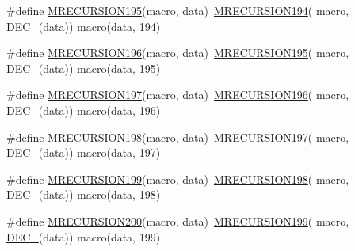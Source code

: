 \begin{DoxyCompactItemize}
\item 
\#define \mbox{\hyperlink{group__group__sam0__utils__mrecursion_ga4f360a4ac5882dfa8c9c2ce94e1bf496}{M\+R\+E\+C\+U\+R\+S\+I\+O\+N195}}(macro,  data)~\mbox{\hyperlink{group__group__sam0__utils__mrecursion_ga68e422a9d4d85b27a7c8b4fb415266d4}{M\+R\+E\+C\+U\+R\+S\+I\+O\+N194}}(  macro, \mbox{\hyperlink{group__group__sam0__utils__mrecursion_ga1d23d683797679dca8c3512a54a5dcae}{D\+E\+C\+\_\+}}(data))   macro(data, 194)
\item 
\#define \mbox{\hyperlink{group__group__sam0__utils__mrecursion_gad4a12ea05cb3470468f67b26d9459f8f}{M\+R\+E\+C\+U\+R\+S\+I\+O\+N196}}(macro,  data)~\mbox{\hyperlink{group__group__sam0__utils__mrecursion_ga4f360a4ac5882dfa8c9c2ce94e1bf496}{M\+R\+E\+C\+U\+R\+S\+I\+O\+N195}}(  macro, \mbox{\hyperlink{group__group__sam0__utils__mrecursion_ga1d23d683797679dca8c3512a54a5dcae}{D\+E\+C\+\_\+}}(data))   macro(data, 195)
\item 
\#define \mbox{\hyperlink{group__group__sam0__utils__mrecursion_gae419c59f8b191d6b6dd3c3c3e94448b6}{M\+R\+E\+C\+U\+R\+S\+I\+O\+N197}}(macro,  data)~\mbox{\hyperlink{group__group__sam0__utils__mrecursion_gad4a12ea05cb3470468f67b26d9459f8f}{M\+R\+E\+C\+U\+R\+S\+I\+O\+N196}}(  macro, \mbox{\hyperlink{group__group__sam0__utils__mrecursion_ga1d23d683797679dca8c3512a54a5dcae}{D\+E\+C\+\_\+}}(data))   macro(data, 196)
\item 
\#define \mbox{\hyperlink{group__group__sam0__utils__mrecursion_gae809796894cf07b1f6d2c9e04b473764}{M\+R\+E\+C\+U\+R\+S\+I\+O\+N198}}(macro,  data)~\mbox{\hyperlink{group__group__sam0__utils__mrecursion_gae419c59f8b191d6b6dd3c3c3e94448b6}{M\+R\+E\+C\+U\+R\+S\+I\+O\+N197}}(  macro, \mbox{\hyperlink{group__group__sam0__utils__mrecursion_ga1d23d683797679dca8c3512a54a5dcae}{D\+E\+C\+\_\+}}(data))   macro(data, 197)
\item 
\#define \mbox{\hyperlink{group__group__sam0__utils__mrecursion_gae1ce17a67961e22bff5e4b9e20f128f0}{M\+R\+E\+C\+U\+R\+S\+I\+O\+N199}}(macro,  data)~\mbox{\hyperlink{group__group__sam0__utils__mrecursion_gae809796894cf07b1f6d2c9e04b473764}{M\+R\+E\+C\+U\+R\+S\+I\+O\+N198}}(  macro, \mbox{\hyperlink{group__group__sam0__utils__mrecursion_ga1d23d683797679dca8c3512a54a5dcae}{D\+E\+C\+\_\+}}(data))   macro(data, 198)
\item 
\#define \mbox{\hyperlink{group__group__sam0__utils__mrecursion_ga813c3af979e8abfb90f9ca68f7f58a78}{M\+R\+E\+C\+U\+R\+S\+I\+O\+N200}}(macro,  data)~\mbox{\hyperlink{group__group__sam0__utils__mrecursion_gae1ce17a67961e22bff5e4b9e20f128f0}{M\+R\+E\+C\+U\+R\+S\+I\+O\+N199}}(  macro, \mbox{\hyperlink{group__group__sam0__utils__mrecursion_ga1d23d683797679dca8c3512a54a5dcae}{D\+E\+C\+\_\+}}(data))   macro(data, 199)

\end{DoxyCompactItemize}
